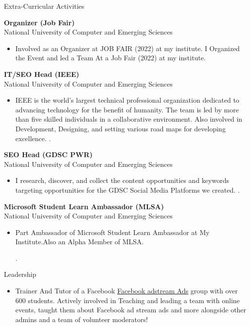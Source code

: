 \documentclass{resume}
\begin{document}
\begin{rSection}{Extra-Curricular Activities} 

 \textbf{Organizer (Job Fair)} \\
National University of Computer and Emerging Sciences
 \begin{itemize}
     \item Involved as an Organizer at JOB FAIR (2022) at my institute. I Organized the Event and led a Team At a Job Fair (2022) at my institute. 
     
 \end{itemize}

 \textbf{IT/SEO Head (IEEE)} \\
National University of Computer and Emerging Sciences
 \begin{itemize}
     \item IEEE is the world’s largest technical professional organization dedicated to advancing technology
 for the benefit of humanity.
The team is led by more than five skilled individuals in a collaborative environment. Also involved 
in Development, Designing, and setting various road maps for developing excellence.
.
     
 \end{itemize}

 \textbf{SEO Head (GDSC PWR)	} \\
National University of Computer and Emerging Sciences
 \begin{itemize}
     \item I research, discover, and collect the content opportunities and keywords targeting opportunities for
 the GDSC Social Media Platforms we created.
.
     
 \end{itemize}

 \textbf{Microsoft Student Learn Ambassador	(MLSA)} \\
National University of Computer and Emerging Sciences
 \begin{itemize}
     \item Part  Ambassador of Microsoft Student Learn Ambassador at My Institute.Also an Alpha Member of MLSA.

.
     
 \end{itemize}


\end{rSection}

\begin{rSection}{Leadership} 
\begin{itemize}
    \item Trainer And Tutor of a Facebook \href{}{Facebook adstream Ads} group with over 600 students. Actively involved in Teaching and leading a team with online events, taught them about Facebook ad stream ads and more alongside other admins and a team of volunteer moderators! 
\end{itemize}


\end{rSection}
\end{document}
